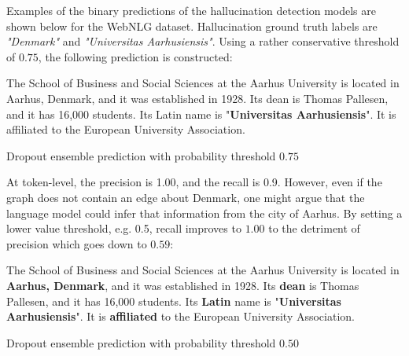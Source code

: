 Examples of the binary predictions of the hallucination detection models are shown below for the WebNLG dataset. Hallucination ground truth labels are \textit{"Denmark"} and \textit{"Universitas Aarhusiensis"}. Using a rather conservative threshold of $0.75$, the following prediction is constructed:


\epigraph{
The School of Business and Social Sciences at the Aarhus University is located in Aarhus, Denmark, and it was established in 1928. Its dean is Thomas Pallesen, and it has 16,000 students. Its Latin name is "\textcolor{BrickRed}{\textbf{Universitas Aarhusiensis}}". It is affiliated to the European University Association.
}{Dropout ensemble prediction with probability threshold $0.75$}

At token-level, the precision is 1.00, and the recall is 0.9. However, even if the graph does not contain an edge about Denmark, one might argue that the language model could infer that information from the city of Aarhus. By setting a lower value threshold, e.g. 0.5, recall improves to $1.00$ to the detriment of precision which goes down to $0.59$:

\epigraph{
The School of Business and Social Sciences at the Aarhus University is located in \textcolor{BrickRed}{\textbf{Aarhus, Denmark}}, and it was established in 1928. Its \textcolor{BrickRed}{\textbf{dean}} is Thomas Pallesen, and it has 16,000 students. Its \textcolor{BrickRed}{\textbf{Latin}} name is "\textcolor{BrickRed}{\textbf{Universitas Aarhusiensis}}". It is \textcolor{BrickRed}{\textbf{affiliated}} to the European University Association.
}{Dropout ensemble prediction with probability threshold $0.50$} 
